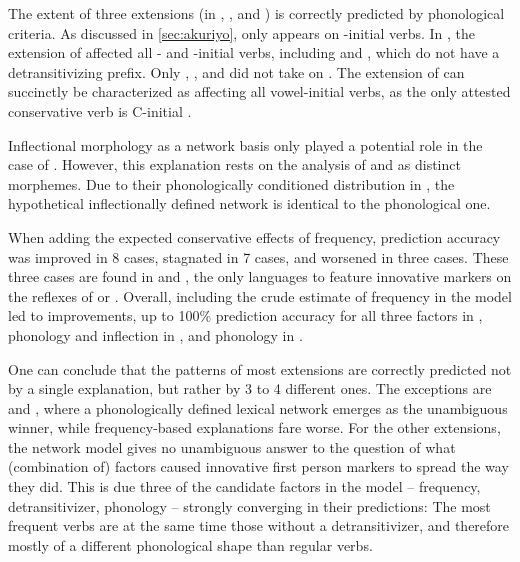 The extent of three extensions (in \akuriyo, \carijo, and \yukpa) is correctly predicted by phonological criteria.
As discussed in \cref{sec:akuriyo}, \akuriyo {} only appears on -initial verbs.
In \carijo, the extension of  affected all - and -initial verbs, including   and  , which do not have a detransitivizing prefix.
Only  ,  , and   did not take on .
The extension of \yukpa {} can succinctly be characterized as affecting all vowel-initial verbs, as the only attested conservative verb is C-initial  .

Inflectional morphology as a network basis only played a potential role in the case of \akuriyo.
However, this explanation rests on the analysis of  and  as distinct morphemes.
Due to their phonologically conditioned distribution in \PTir, the hypothetical inflectionally defined network is identical to the phonological one.

When adding the expected conservative effects of frequency, prediction accuracy was improved in 8 cases, stagnated in 7 cases, and worsened in three cases.
These three cases are found in \carijo and \yukpa, the only languages to feature innovative markers on the reflexes of   or  .
Overall, including the crude estimate of frequency in the model led to improvements, up to 100\% prediction accuracy for all three factors in \PTir, phonology and inflection in \PWai, and phonology in \PPek.

One can conclude that the patterns of most extensions are correctly predicted not by a single explanation, but rather by 3 to 4 different ones.
The exceptions are \carijo and \yukpa, where a phonologically defined lexical network emerges as the unambiguous winner, while frequency-based explanations fare worse.
For the other extensions, the network model gives no unambiguous answer to the question of what (combination of) factors caused innovative first person markers to spread the way they did.
This is due three of the candidate factors in the model -- frequency, detransitivizer, phonology -- strongly converging in their predictions:
The most frequent  verbs are at the same time those without a detransitivizer, and therefore mostly of a different phonological shape than regular  verbs.
